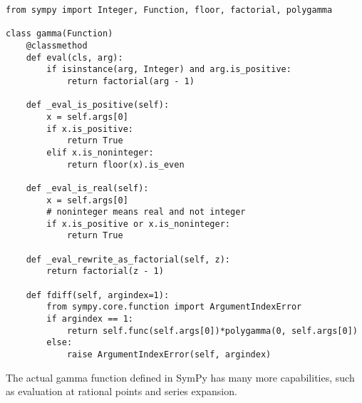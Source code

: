 \lstset{
  basicstyle=\ttfamily,
}

\begin{lstlisting}[caption={A stripped down version of \texttt{sympy.gamma}.},label=fig:gamma-example]
from sympy import Integer, Function, floor, factorial, polygamma

class gamma(Function)
    @classmethod
    def eval(cls, arg):
        if isinstance(arg, Integer) and arg.is_positive:
            return factorial(arg - 1)

    def _eval_is_positive(self):
        x = self.args[0]
        if x.is_positive:
            return True
        elif x.is_noninteger:
            return floor(x).is_even

    def _eval_is_real(self):
        x = self.args[0]
        # noninteger means real and not integer
        if x.is_positive or x.is_noninteger:
            return True

    def _eval_rewrite_as_factorial(self, z):
        return factorial(z - 1)

    def fdiff(self, argindex=1):
        from sympy.core.function import ArgumentIndexError
        if argindex == 1:
            return self.func(self.args[0])*polygamma(0, self.args[0])
        else:
            raise ArgumentIndexError(self, argindex)
\end{lstlisting}
The actual gamma function defined in SymPy has many more capabilities, such as
evaluation at rational points and series expansion.
